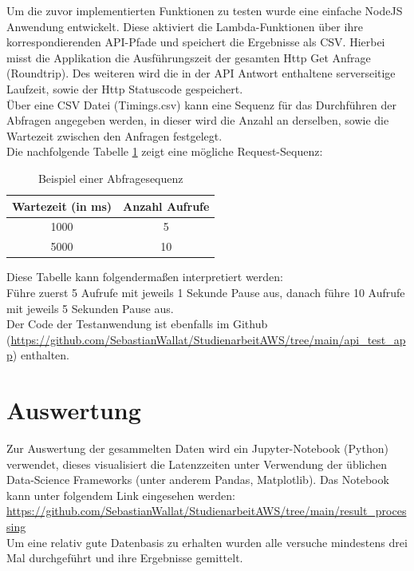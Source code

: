 \documentclass[12pt,a4paper,parskip=half]{scrreprt}
\begin{document}
Um die zuvor implementierten Funktionen zu testen wurde eine einfache NodeJS Anwendung entwickelt. Diese aktiviert die Lambda-Funktionen über ihre korrespondierenden API-Pfade und speichert die Ergebnisse als CSV. Hierbei misst die Applikation die Ausführungszeit der gesamten Http Get Anfrage (Roundtrip). Des weiteren wird die in der API Antwort enthaltene serverseitige Laufzeit, sowie der Http Statuscode gespeichert.
\\
Über eine CSV Datei (Timings.csv) kann eine Sequenz für das Durchführen der Abfragen angegeben werden, in dieser wird die Anzahl an derselben, sowie die Wartezeit zwischen den Anfragen festgelegt.
\\
Die nachfolgende Tabelle \ref{table:1} zeigt eine mögliche Request-Sequenz:
\begin{table}[h!]
	\centering
	\begin{tabular}{||c c||} 
		\hline
		Wartezeit (in ms) & Anzahl Aufrufe \\ [0.5ex] 
		\hline\hline
		1000 & 5 \\
		5000 & 10 \\[1ex] 
		\hline
	\end{tabular}
	\caption{Beispiel einer Abfragesequenz}
	\label{table:1}
\end{table}

Diese Tabelle kann folgendermaßen interpretiert werden:\\
Führe zuerst 5 Aufrufe mit jeweils 1 Sekunde Pause aus, danach führe 10 Aufrufe mit jeweils 5 Sekunden Pause aus.
\\
Der Code der Testanwendung ist ebenfalls im Github (\url{https://github.com/SebastianWallat/StudienarbeitAWS/tree/main/api_test_app}) enthalten.

\newpage
\section{Auswertung}

Zur Auswertung der gesammelten Daten wird ein Jupyter-Notebook (Python) verwendet, dieses visualisiert die Latenzzeiten unter Verwendung der üblichen Data-Science Frameworks (unter anderem Pandas, Matplotlib). Das Notebook kann unter folgendem Link eingesehen werden: \url{https://github.com/SebastianWallat/StudienarbeitAWS/tree/main/result_processing}
\\
Um eine relativ gute Datenbasis zu erhalten wurden alle versuche mindestens drei Mal durchgeführt und ihre Ergebnisse gemittelt.
\end{document}
